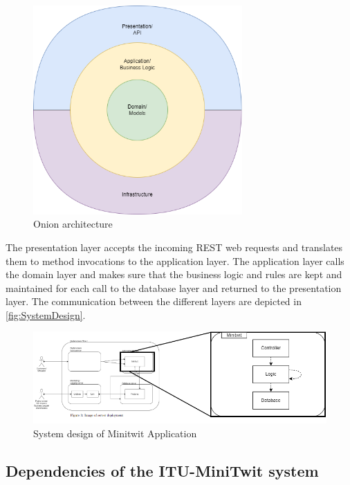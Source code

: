 \begin{figure}[!ht]
    \centering
    \includegraphics[width=80mm]{images/diagrams/ApplicationOverview.png}
    \captionsetup{justification=centering,margin=1cm}
    \caption{Onion architecture}
    \label{fig:onion_architecture}
\end{figure}


The presentation layer accepts the incoming REST web requests and translates them to method invocations to the application layer. The application layer calls the domain layer and makes sure that the business logic and rules are kept and maintained for each call to the database layer and returned to the presentation layer. The communication between the different layers are depicted in \autoref{fig:SystemDesign}.

\begin{figure}[!ht]
    \centering
    \captionsetup{justification=centering,margin=1cm}
    \includegraphics[width=\linewidth]{images/diagrams/system-design-version2.drawio.png}
    \caption{System design of Minitwit Application}
    \label{fig:SystemDesign}
\end{figure}


\subsection{Dependencies of the ITU-MiniTwit system}

